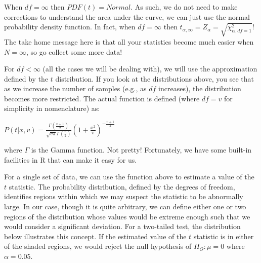 \documentclass[
  letterpaper,
]{book}
\begin{document}
When \(df=\infty\) then \(PDF(t) = Normal\). As such, we do not need to
make corrections to understand the area under the curve, we can just use
the normal probability density function. In fact, when \(df=\infty\)
then \(t_{\alpha,\infty} = Z_{\alpha} = \sqrt{\chi^2_{\alpha,df=1}}\)!
The take home message here is that all your statistics become much
easier when \(N=\infty\), so go collect some more data!

For \(df < \infty\) (all the cases we will be dealing with), we will use
the approximation defined by the \(t\) distribution. If you look at the
distributions above, you see that as we increase the number of samples
(e.g., as \(df\) increases), the distribution becomes more restricted.
The actual function is defined (where \(df = v\) for simplicity in
nomenclature) as:

\(P(t|x,v)= \frac{ \Gamma\left( \frac{v+1}{2}\right)}{\sqrt{v\pi}\Gamma\left( \frac{v}{2}\right)} \left( 1 + \frac{x^2}{v}\right)^{-\frac{v+1}{2}}\)

where \(\Gamma\) is the Gamma function. Not pretty! Fortunately, we have
some built-in facilities in R that can make it easy for us.

For a single set of data, we can use the function above to estimate a
value of the \(t\) statistic. The probability distribution, defined by
the degrees of freedom, identifies regions within which we may suspect
the statistic to be abnormally large. In our case, though it is quite
arbitrary, we can define either one or two regions of the distribution
whose values would be extreme enough such that we would consider a
significant deviation. For a two-tailed test, the distribution below
illustrates this concept. If the estimated value of the \(t\) statistic
is in either of the shaded regions, we would reject the null hypothesis
of \(H_O: \mu = 0\) where \(\alpha=0.05\).
\end{document}
